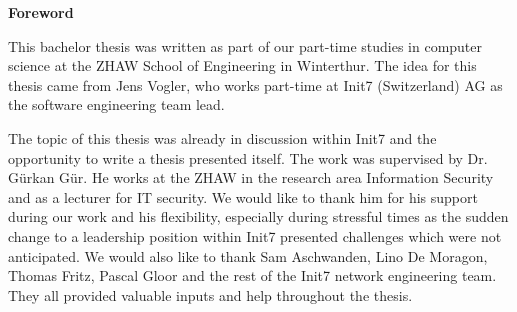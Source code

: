 \thispagestyle{empty}
\clearpage
\null
\vfil %
\begin{center}\textbf{Foreword}\end{center}

This bachelor thesis was written as part of our part-time studies in computer 
science at the ZHAW School of Engineering in Winterthur. 
The idea for this thesis came from Jens Vogler, who works part-time at Init7 (Switzerland) AG 
as the software engineering team lead. 

The topic of this thesis was already in discussion within Init7 and the opportunity
to write a thesis presented itself.
The work was supervised by Dr. Gürkan Gür. He works at the ZHAW in the research area Information Security
and as a lecturer for IT security. 
We would like to thank him for his support during our work and his flexibility, 
especially during stressful times as the sudden change to a leadership position within Init7
presented challenges which were not anticipated. 
We would also like to thank Sam Aschwanden, Lino De Moragon, Thomas Fritz, Pascal Gloor and the
rest of the Init7 network engineering team. 
They all provided valuable inputs and help throughout the thesis.